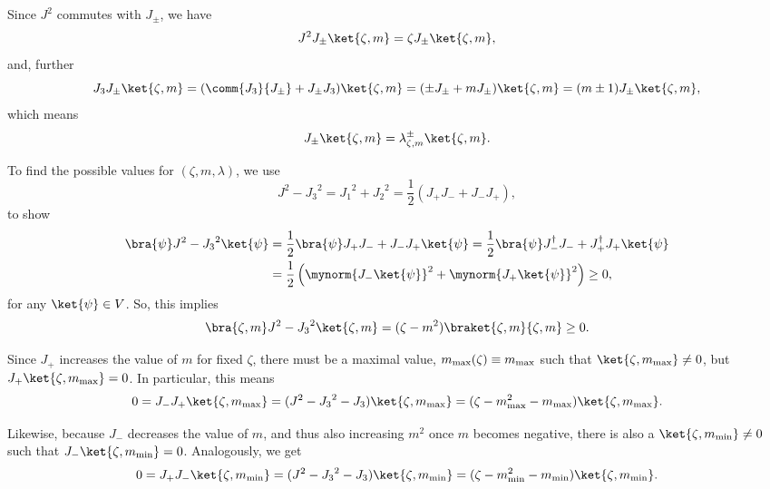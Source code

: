 Since $J^2$ commutes with $J_\pm$, we have
\begin{equation*}
    J^2 J_\pm \ket{\zeta, m} = \zeta J_\pm \ket{\zeta, m},
\end{equation*}
and, further
\begin{equation*}
    J_3 J_\pm \ket{\zeta, m} = (\comm{J_3}{J_\pm} + J_\pm J_3) \ket{\zeta, m} = (\pm J_\pm + m J_\pm) \ket{\zeta, m} = (m \pm 1) J_\pm \ket{\zeta, m},
\end{equation*}
which means
\begin{equation}
    J_\pm \ket{\zeta, m} = \lambda^\pm_{\zeta,m} \ket{\zeta, m} .
\end{equation}

To find the possible values for $(\zeta, m, \lambda)$, we use
\begin{equation*}
    J^2 - {J_3}^2 = {J_1}^2 + {J_2}^2 = \frac{1}{2} (J_+ J_- + J_- J_+),
\end{equation*}
to show
\begin{equation*}
\begin{split}
    \bra{\psi} J^2 - {J_3}^2 \ket{\psi} &= \frac{1}{2} \bra{\psi} J_+ J_- + J_- J_+ \ket{\psi} = \frac{1}{2} \bra{\psi} J^\dagger_- J_- + J_+^\dagger J_+ \ket{\psi} \\ &= \frac{1}{2} \left( \mynorm{J_- \ket{\psi}}^2 + \mynorm{J_+ \ket{\psi}}^2  \right) \geq 0 ,
\end{split}
\end{equation*}
for any $\ket{\psi} \in V$. So, this implies
\begin{equation*}
    \bra{\zeta, m } J^2 - {J_3}^2 \ket{\zeta,m} = (\zeta - m^2) \braket{\zeta,m}{\zeta,m} \geq 0 .
\end{equation*}

Since $J_+$ increases the value of $m$ for fixed $\zeta$, there must be a maximal value, $m_\textup{max}(\zeta) \equiv m_\textup{max}$ such that $\ket{\zeta, m_\textup{max}} \neq 0$, but $J_+ \ket{\zeta, m_\textup{max}} = 0$. In particular, this means
\begin{equation*}
    0 = J_- J_+ \ket{\zeta, m_\textup{max}} = (J^2 - {J_3}^2 - J_3) \ket{\zeta, m_\textup{max}} = (\zeta - m^2_\textup{max} - m_\textup{max}) \ket{\zeta, m_\textup{max}} .
\end{equation*}

Likewise, because $J_-$ decreases the value of $m$, and thus also increasing $m^2$ once $m$ becomes negative, there is also a $\ket{\zeta, m_\textup{min}} \neq 0$ such that $J_- \ket{\zeta, m_\textup{min}} = 0$. Analogously, we get
\begin{equation*}
    0 = J_+ J_- \ket{\zeta, m_\textup{min}} = (J^2 - {J_3}^2 - J_3) \ket{\zeta, m_\textup{min}} = (\zeta - m^2_\textup{min} - m_\textup{min}) \ket{\zeta, m_\textup{min}} .
\end{equation*}

